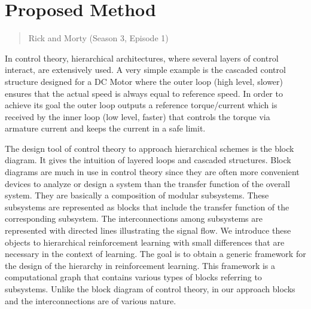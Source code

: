 \chapter{Proposed Method}
\label{proposed}
\thispagestyle{empty}

\begin{quotation}
{\footnotesize
{}
\begin{flushright}
Rick and Morty (Season 3, Episode 1)
\end{flushright}
}
\end{quotation}



\vspace{0.5cm}

In control theory, hierarchical architectures, where several layers of control interact, are extensively used. A very simple example is the cascaded control structure designed for a DC Motor where the outer loop (high level, slower) ensures that the actual speed is always equal to reference speed. In order to achieve its goal the outer loop outputs a reference torque/current which is received by the inner loop (low level, faster) that controls the torque via armature current and keeps the current in a safe limit. 

The design tool of control theory to approach hierarchical schemes is the block diagram. It gives the intuition of layered loops and cascaded structures. Block diagrams are much in use in control theory since they are often more convenient devices to analyze or design a system than the transfer function of the overall system. They are basically a composition of modular subsystems. These subsystems are represented as blocks that include the transfer function of the corresponding subsystem. The interconnections among subsystems are represented with directed lines illustrating the signal flow. We introduce these objects to hierarchical reinforcement learning with small differences that are necessary in the context of learning. The goal is to obtain a generic framework for the design of the hierarchy in reinforcement learning. This framework is a computational graph that contains various types of blocks referring to subsystems. Unlike the block diagram of control theory, in our approach blocks and the interconnections are of various nature.

